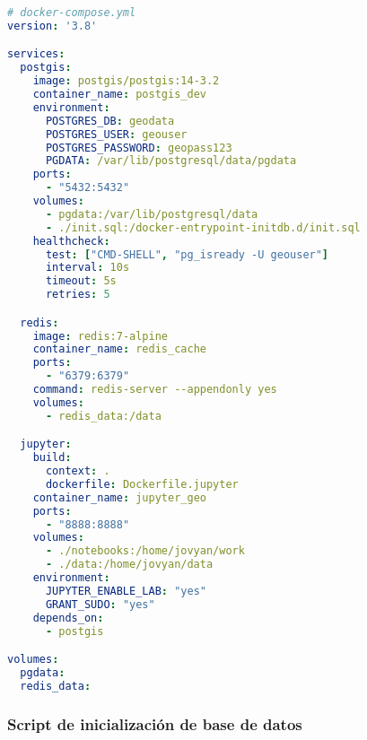 \documentclass[11pt,a4paper]{article}
\begin{document}
\begin{lstlisting}[language=yaml]
# docker-compose.yml
version: '3.8'

services:
  postgis:
    image: postgis/postgis:14-3.2
    container_name: postgis_dev
    environment:
      POSTGRES_DB: geodata
      POSTGRES_USER: geouser
      POSTGRES_PASSWORD: geopass123
      PGDATA: /var/lib/postgresql/data/pgdata
    ports:
      - "5432:5432"
    volumes:
      - pgdata:/var/lib/postgresql/data
      - ./init.sql:/docker-entrypoint-initdb.d/init.sql
    healthcheck:
      test: ["CMD-SHELL", "pg_isready -U geouser"]
      interval: 10s
      timeout: 5s
      retries: 5

  redis:
    image: redis:7-alpine
    container_name: redis_cache
    ports:
      - "6379:6379"
    command: redis-server --appendonly yes
    volumes:
      - redis_data:/data

  jupyter:
    build:
      context: .
      dockerfile: Dockerfile.jupyter
    container_name: jupyter_geo
    ports:
      - "8888:8888"
    volumes:
      - ./notebooks:/home/jovyan/work
      - ./data:/home/jovyan/data
    environment:
      JUPYTER_ENABLE_LAB: "yes"
      GRANT_SUDO: "yes"
    depends_on:
      - postgis

volumes:
  pgdata:
  redis_data:
\end{lstlisting}

\subsubsection{Script de inicialización de base de datos}
\end{document}
